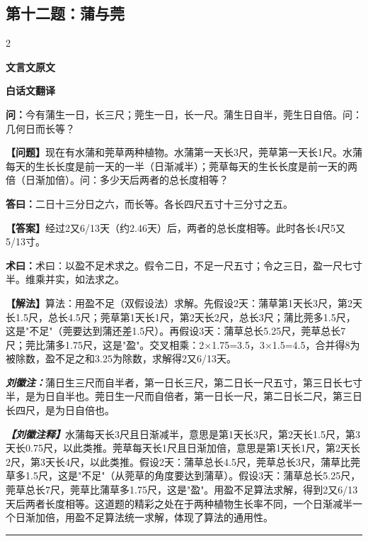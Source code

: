 \documentclass[10pt,a4paper]{article}
\newcommand{\wen}[1]{\textbf{\color{problemcolor}问：}#1\par}
\newcommand{\da}[1]{\textbf{答曰：}#1\par}
\newcommand{\shu}[1]{\textbf{术曰：}#1\par}
\newcommand{\liuhui}[1]{{\color{commentarycolor}\textit{\textbf{刘徽注：}}#1\par}}
\newcommand{\classicalheader}[1]{{\centering\large\bfseries\color{classicalcolor} #1\par\vspace{0.5em}}}
\newcommand{\wenmodern}[1]{\textbf{\color{moderncolor}【问题】}#1\par}
\newcommand{\damodern}[1]{\textbf{【答案】}#1\par}
\newcommand{\shumodern}[1]{\textbf{【解法】}#1\par}
\newcommand{\liuhuimodern}[1]{{\color{commentarycolor}\textit{\textbf{【刘徽注释】}}#1\par}}
\newcommand{\modernheader}[1]{{\centering\large\bfseries\color{moderncolor} #1\par\vspace{0.5em}}}
\newcommand{\problemsec}[1]{\subsection*{#1}}
\begin{document}
\problemsec{第十二题：蒲与莞}
\begin{paracol}{2}
\classicalheader{文言文原文}
\switchcolumn
\modernheader{白话文翻译}
\switchcolumn*

\wen{今有蒲生一日，长三尺；莞生一日，长一尺。蒲生日自半，莞生日自倍。问：几何日而长等？}

\switchcolumn

\wenmodern{现在有水蒲和莞草两种植物。水蒲第一天长3尺，莞草第一天长1尺。水蒲每天的生长长度是前一天的一半（日渐减半）；莞草每天的生长长度是前一天的两倍（日渐加倍）。问：多少天后两者的总长度相等？}

\switchcolumn*

\da{二日十三分日之六，而长等。各长四尺五寸十三分寸之五。}

\switchcolumn

\damodern{经过2又6/13天（约2.46天）后，两者的总长度相等。此时各长4尺5又5/13寸。}

\switchcolumn*

\shu{术曰：以盈不足术求之。假令二日，不足一尺五寸；令之三日，盈一尺七寸半。维乘并实，如法求之。}

\switchcolumn

\shumodern{算法：用盈不足（双假设法）求解。先假设2天：蒲草第1天长3尺，第2天长1.5尺，总长4.5尺；莞草第1天长1尺，第2天长2尺，总长3尺；蒲比莞多1.5尺，这是"不足"（莞要达到蒲还差1.5尺）。再假设3天：蒲草总长5.25尺，莞草总长7尺；莞比蒲多1.75尺，这是"盈"。交叉相乘：2×1.75=3.5，3×1.5=4.5，合并得8为被除数，盈不足之和3.25为除数，求解得2又6/13天。}

\switchcolumn*

\liuhui{蒲日生三尺而自半者，第一日长三尺，第二日长一尺五寸，第三日长七寸半，是为日自半也。莞日生一尺而自倍者，第一日长一尺，第二日长二尺，第三日长四尺，是为日自倍也。}

\switchcolumn

\liuhuimodern{水蒲每天长3尺且日渐减半，意思是第1天长3尺，第2天长1.5尺，第3天长0.75尺，以此类推。莞草每天长1尺且日渐加倍，意思是第1天长1尺，第2天长2尺，第3天长4尺，以此类推。假设2天：蒲草总长4.5尺，莞草总长3尺，蒲草比莞草多1.5尺，这是"不足"（从莞草的角度要达到蒲草）。假设3天：蒲草总长5.25尺，莞草总长7尺，莞草比蒲草多1.75尺，这是"盈"。用盈不足算法求解，得到2又6/13天后两者长度相等。这道题的精彩之处在于两种植物生长率不同，一个日渐减半一个日渐加倍，用盈不足算法统一求解，体现了算法的通用性。}

\end{paracol}

\vspace{0.3cm}
\hrule
\vspace{0.3cm}
\end{document}
